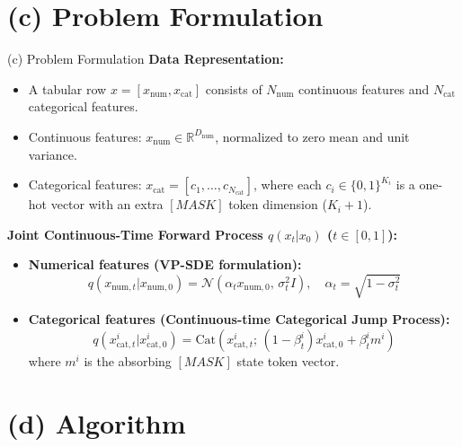 \documentclass[aspectratio=169, 10pt]{beamer}
\begin{document}
\section{(c) Problem Formulation}

\begin{frame}{(c) Problem Formulation}
  \textbf{Data Representation:}
  \begin{itemize}
    \item A tabular row $x = [x_{\text{num}}, x_{\text{cat}}]$ consists of $N_{\text{num}}$ continuous features and $N_{\text{cat}}$ categorical features.
    \item Continuous features: $x_{\text{num}} \in \mathbb{R}^{D_{\text{num}}}$, normalized to zero mean and unit variance.
    \item Categorical features: $x_{\text{cat}} = [c_1, \dots, c_{N_{\text{cat}}}]$, where each $c_i \in \{0, 1\}^{K_i}$ is a one-hot vector with an extra $[MASK]$ token dimension ($K_i + 1$).
  \end{itemize}
  \vspace{0.3cm}
  \textbf{Joint Continuous-Time Forward Process $q(x_t | x_0)$ ($t \in [0, 1]$):}
  \begin{itemize}
    \item \textbf{Numerical features (VP-SDE formulation):}
      $$q(x_{\text{num}, t} | x_{\text{num}, 0}) = \mathcal{N}\left(\alpha_t x_{\text{num}, 0},\, \sigma_t^2 I\right), \quad \alpha_t = \sqrt{1 - \sigma_t^2}$$
    \item \textbf{Categorical features (Continuous-time Categorical Jump Process):}
      $$q(x_{\text{cat}, t}^i | x_{\text{cat}, 0}^i) = \text{Cat}\left(x_{\text{cat}, t}^i;\, (1 - \beta_t^i) x_{\text{cat}, 0}^i + \beta_t^i m^i\right)$$
      where $m^i$ is the absorbing $[MASK]$ state token vector.
  \end{itemize}
\end{frame}

\section{(d) Algorithm}
\end{document}
